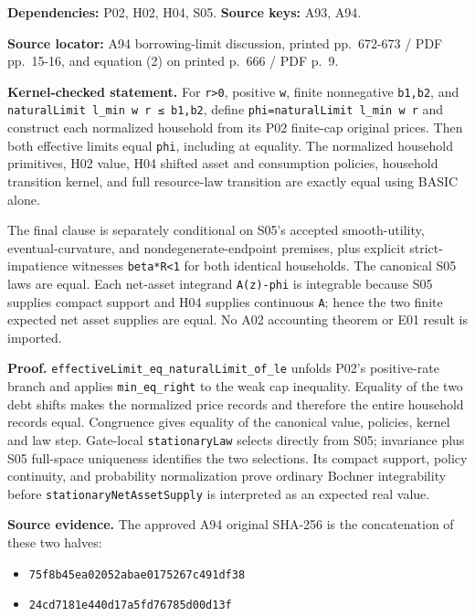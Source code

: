 \documentclass[
  11pt,
]{article}
\providecommand{\tightlist}{%
  \setlength{\itemsep}{0pt}\setlength{\parskip}{0pt}}
\let\LedgerOriginalTexttt\texttt
\renewcommand{\texttt}[1]{{\small\LedgerOriginalTexttt{#1}}}
\begin{document}
\textbf{Dependencies:} P02, H02, H04, S05. \textbf{Source keys:} A93,
A94.

\textbf{Source locator:} A94 borrowing-limit discussion, printed
pp.~672-673 / PDF pp.~15-16, and equation (2) on printed p.~666 / PDF
p.~9.

\textbf{Kernel-checked statement.} For \texttt{r\textgreater{}0},
positive \texttt{w}, finite nonnegative \texttt{b1,b2}, and
\texttt{naturalLimit\ l\_min\ w\ r\ ≤\ b1,b2}, define
\texttt{phi=naturalLimit\ l\_min\ w\ r} and construct each normalized
household from its P02 finite-cap original prices. Then both effective
limits equal \texttt{phi}, including at equality. The normalized
household primitives, H02 value, H04 shifted asset and consumption
policies, household transition kernel, and full resource-law transition
are exactly equal using BASIC alone.

The final clause is separately conditional on S05's accepted
smooth-utility, eventual-curvature, and nondegenerate-endpoint premises,
plus explicit strict-impatience witnesses \texttt{beta*R\textless{}1}
for both identical households. The canonical S05 laws are equal. Each
net-asset integrand \texttt{A(z)-phi} is integrable because S05 supplies
compact support and H04 supplies continuous \texttt{A}; hence the two
finite expected net asset supplies are equal. No A02 accounting theorem
or E01 result is imported.

\textbf{Proof.} \texttt{effectiveLimit\_eq\_naturalLimit\_of\_le}
unfolds P02's positive-rate branch and applies \texttt{min\_eq\_right}
to the weak cap inequality. Equality of the two debt shifts makes the
normalized price records and therefore the entire household records
equal. Congruence gives equality of the canonical value, policies,
kernel and law step. Gate-local \texttt{stationaryLaw} selects directly
from S05; invariance plus S05 full-space uniqueness identifies the two
selections. Its compact support, policy continuity, and probability
normalization prove ordinary Bochner integrability before
\texttt{stationaryNetAssetSupply} is interpreted as an expected real
value.

\textbf{Source evidence.} The approved A94 original SHA-256 is the
concatenation of these two halves:

\begin{itemize}
\tightlist
\item
  \texttt{75f8b45ea02052abae0175267c491df38}
\item
  \texttt{24cd7181e440d17a5fd76785d00d13f}
\end{itemize}
\end{document}
